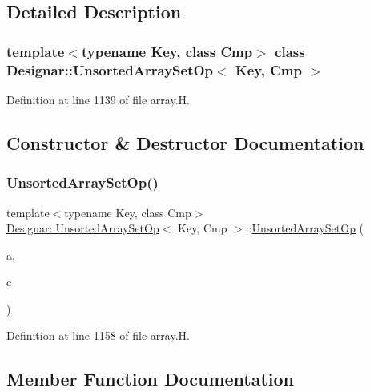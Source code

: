 \subsection{Detailed Description}
\subsubsection*{template$<$typename Key, class Cmp$>$\newline
class Designar\+::\+Unsorted\+Array\+Set\+Op$<$ Key, Cmp $>$}



Definition at line 1139 of file array.\+H.



\subsection{Constructor \& Destructor Documentation}
\mbox{\label{class_designar_1_1_unsorted_array_set_op_a3f01d03aaf449273fd884809764cf841}} 
\subsubsection{\texorpdfstring{Unsorted\+Array\+Set\+Op()}{UnsortedArraySetOp()}}
{\footnotesize\ttfamily template$<$typename Key, class Cmp$>$ \\
\hyperlink{class_designar_1_1_unsorted_array_set_op}{Designar\+::\+Unsorted\+Array\+Set\+Op}$<$ Key, Cmp $>$\+::\hyperlink{class_designar_1_1_unsorted_array_set_op}{Unsorted\+Array\+Set\+Op} (\begin{DoxyParamCaption}\item[{\hyperlink{class_designar_1_1_dyn_array}{Dyn\+Array}$<$ Key $>$ \&}]{a,  }\item[{Cmp \&}]{c }\end{DoxyParamCaption})\hspace{0.3cm}{\ttfamily [inline]}}



Definition at line 1158 of file array.\+H.



\subsection{Member Function Documentation}
\mbox{\label{class_designar_1_1_unsorted_array_set_op_adaba74cc7cc8541af17b7324b9ac3eb4}} 
